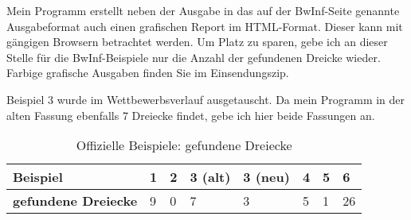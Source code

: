 Mein Programm erstellt neben der Ausgabe in das auf der BwInf-Seite genannte
Ausgabeformat auch einen grafischen Report im HTML-Format.
Dieser kann mit gängigen Browsern betrachtet werden.
Um Platz zu sparen, gebe ich an dieser Stelle für die BwInf-Beispiele nur die Anzahl
der gefundenen Dreicke wieder. Farbige grafische Ausgaben finden Sie im Einsendungszip.

Beispiel 3 wurde im Wettbewerbsverlauf ausgetauscht. Da mein Programm in der alten
Fassung ebenfalls 7 Dreiecke findet, gebe ich hier beide Fassungen an.

\begin{table}[h]
    \centering
    \begin{tabular}{l|llllll}
        \textbf{Beispiel}           & 1 & 2 & 3 (alt) & 3 (neu) & 4 & 5 & 6 \\ \hline
        \textbf{gefundene Dreiecke} & 9 & 0 & 7       & 3 & 5 & 1 & 26
    \end{tabular}
    \caption{Offizielle Beispiele: gefundene Dreiecke}
    \label{tab:bwinfbeispiele}
\end{table}
